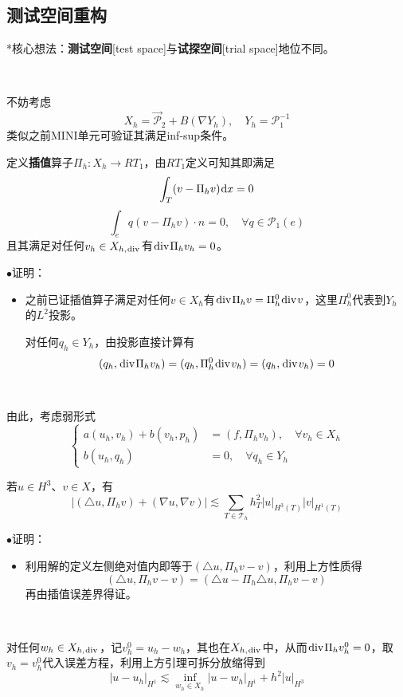 \documentclass[a4paper,UTF8,fontset=windows]{ctexart}
\newcommand*{\dr}{\hspace{0.07em}\mathrm{d}}
\newcommand*{\cp}{\mathcal{P}}
\newcommand*{\ct}{\mathcal{T}}
\renewcommand*{\div}{\hspace{0.07em}\mathrm{div}\hspace{0.07em}}
\newcommand{\proo}[1]{{\kaishu $\bullet$证明：
\begin{itemize}
    \item[] #1
\end{itemize}
}}
\begin{document}
\subsection{测试空间重构}
*核心想法：\textbf{测试空间}[test space]与\textbf{试探空间}[trial space]地位不同。

\

不妨考虑
$$X_h=\vec{\cp}_2+B(\nabla Y_h),\quad Y_h=\cp_1^{-1}$$
类似之前MINI单元可验证其满足inf-sup条件。

定义\textbf{插值}算子$\Pi_h:X_h\to RT_1$，由$RT_1$定义可知其即满足
$$\int_T(v-\Pi_hv)\dr x=0$$
$$\int_eq(v-\Pi_hv)\cdot n=0,\quad\forall q\in\cp_1(e)$$
且其满足对任何$v_h\in X_{h,\div}$有$\div\Pi_hv_h=0$。

\proo{
    之前已证插值算子满足对任何$v\in X_h$有$\div\Pi_h v=\Pi_h^0\div v$，这里$\Pi_h^0$代表到$Y_h$的$L^2$投影。

    对任何$q_h\in Y_h$，由投影直接计算有
    $$(q_h,\div\Pi_hv_h)=(q_h,\Pi_h^0\div v_h)=(q_h,\div v_h)=0$$
}

\

由此，考虑弱形式
$$\begin{cases}a(u_h,v_h)+b(v_h,p_h)&=(f,\Pi_hv_h),\quad\forall v_h\in X_h\\b(u_h,q_h)&=0,\quad\forall q_h\in Y_h\end{cases}$$

若$u\in H^3$、$v\in X$，有
$$|(\triangle u,\Pi_hv)+(\nabla u,\nabla v)|\lesssim\sum_{T\in\ct_h}h_T^2|u|_{H^3(T)}|v|_{H^1(T)}$$

\proo{
    利用解的定义左侧绝对值内即等于$(\triangle u,\Pi_hv-v)$，利用上方性质得
    $$(\triangle u,\Pi_hv-v)=(\triangle u-\Pi_h\triangle u,\Pi_hv-v)$$
    再由插值误差界得证。
}

\

对任何$w_h\in X_{h,\div}$，记$v_h^0=u_h-w_h$，其也在$X_{h,\div}$中，从而$\div\Pi_hv_h^0=0$，取$v_h=v_h^0$代入误差方程，利用上方引理可拆分放缩得到
$$|u-u_h|_{H^1}\lesssim\inf_{w_h\in X_h}|u-w_h|_{H^1}+h^2|u|_{H^3}$$
\end{document}
